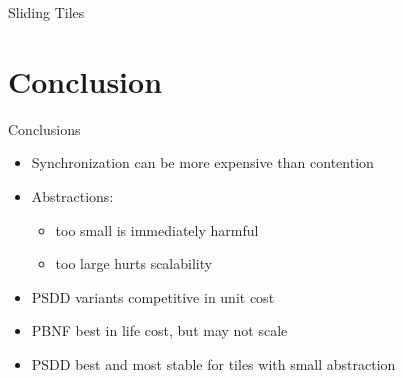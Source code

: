 \documentclass[style=unh]{powerdot}
\begin{document}
\begin{slide}{Sliding Tiles}
\end{slide}


\section{Conclusion}


\begin{slide}{Conclusions}
  \begin{itemize}
  \item Synchronization can be more expensive than contention
  \item Abstractions:
    \begin{itemize}
    \item too small is immediately harmful
    \item too large hurts scalability
    \end{itemize}
  \item PSDD variants competitive in unit cost
  \item PBNF best in life cost, but may not scale
  \item PSDD best and most stable for tiles with small abstraction
  \end{itemize}
\end{slide}
\end{document}
